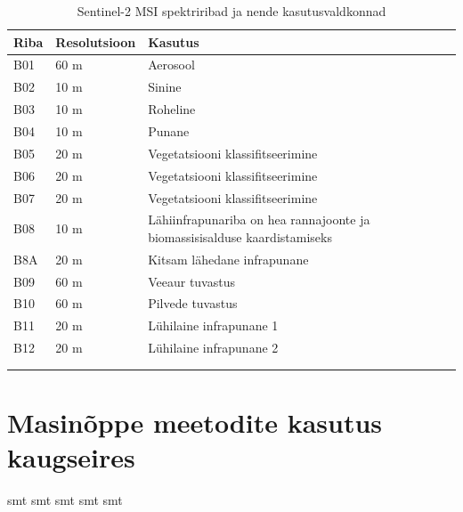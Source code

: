 \begin{longtable}{llll}
    \hline
    Riba & Resolutsioon & Kasutus                          \\ 
    \hline
    B01  & 60 m         & Aerosool                         \\
    B02  & 10 m         & Sinine                           \\
    B03  & 10 m         & Roheline                         \\
    B04  & 10 m         & Punane                           \\
    B05  & 20 m         & Vegetatsiooni klassifitseerimine \\
    B06  & 20 m         & Vegetatsiooni klassifitseerimine \\
    B07  & 20 m         & Vegetatsiooni klassifitseerimine \\
    B08  & 10 m         & Lähiinfrapunariba on hea rannajoonte ja biomassisisalduse kaardistamiseks \\
    B8A  & 20 m         & Kitsam lähedane infrapunane  \\
    B09  & 60 m         & Veeaur tuvastus                       \\
    B10  & 60 m         & Pilvede tuvastus                      \\
    B11  & 20 m         & Lühilaine infrapunane 1      \\
    B12  & 20 m         & Lühilaine infrapunane 2      \\
         &              &                    &                              \\ \hline
    \caption{Sentinel-2 MSI spektriribad ja nende kasutusvaldkonnad}
    \label{tab:s2bands}
\end{longtable}


\section{Masinõppe meetodite kasutus kaugseires}
smt smt smt smt smt
